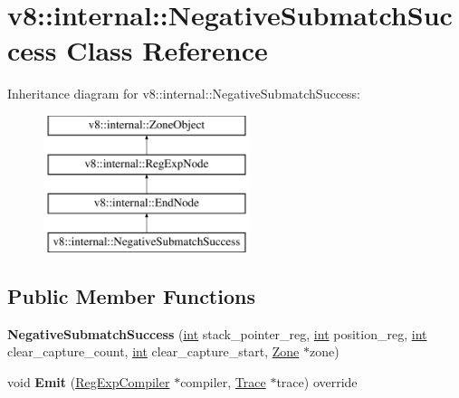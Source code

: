 \hypertarget{classv8_1_1internal_1_1NegativeSubmatchSuccess}{}\section{v8\+:\+:internal\+:\+:Negative\+Submatch\+Success Class Reference}
\label{classv8_1_1internal_1_1NegativeSubmatchSuccess}
Inheritance diagram for v8\+:\+:internal\+:\+:Negative\+Submatch\+Success\+:\begin{figure}[H]
\begin{center}
\leavevmode
\includegraphics[height=4.000000cm]{classv8_1_1internal_1_1NegativeSubmatchSuccess}
\end{center}
\end{figure}
\subsection*{Public Member Functions}
\begin{DoxyCompactItemize}
\item 
\mbox{\label{classv8_1_1internal_1_1NegativeSubmatchSuccess_a792b6773216be761cb742b6243b7b6e8}} 
{\bfseries Negative\+Submatch\+Success} (\mbox{\hyperlink{classint}{int}} stack\+\_\+pointer\+\_\+reg, \mbox{\hyperlink{classint}{int}} position\+\_\+reg, \mbox{\hyperlink{classint}{int}} clear\+\_\+capture\+\_\+count, \mbox{\hyperlink{classint}{int}} clear\+\_\+capture\+\_\+start, \mbox{\hyperlink{classv8_1_1internal_1_1Zone}{Zone}} $\ast$zone)
\item 
\mbox{\label{classv8_1_1internal_1_1NegativeSubmatchSuccess_a49535668ef5525c147dc2b4b97d21ec4}} 
void {\bfseries Emit} (\mbox{\hyperlink{classv8_1_1internal_1_1RegExpCompiler}{Reg\+Exp\+Compiler}} $\ast$compiler, \mbox{\hyperlink{classv8_1_1internal_1_1Trace}{Trace}} $\ast$trace) override
\end{DoxyCompactItemize}
